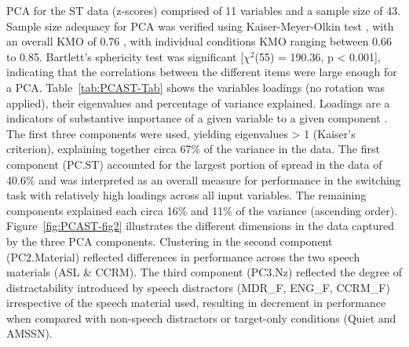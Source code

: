 \documentclass[a4paper, twoside]{templates/ociamthesis}
\begin{document}
PCA for the ST data (z-scores) comprised of 11 variables and a sample size of 43. Sample size adequacy for PCA was verified using Kaiser-Meyer-Olkin test \autocite[psych::KMO;][]{psychPackageR}, with an overall KMO of 0.76 \autocite[`good';][]{Field2012Chpt17}, with individual conditions KMO ranging between 0.66 to 0.85. Bartlett's sphericity test was significant {[}\(\chi^2\)(55) = 190.36, p \textless{} 0.001{]}, indicating that the correlations between the different items were large enough for a PCA. Table~\ref{tab:PCAST-Tab} shows the variables loadings (no rotation was applied), their eigenvalues and percentage of variance explained. Loadings are a indicators of substantive importance of a given variable to a given component \autocite{Field2012Chpt17}. The first three components were used, yielding eigenvalues \textgreater{} 1 (Kaiser's criterion), explaining together circa 67\% of the variance in the data. The first component (PC.ST) accounted for the largest portion of spread in the data of 40.6\% and was interpreted as an overall measure for performance in the switching task with relatively high loadings across all input variables. The remaining components explained each circa 16\% and 11\% of the variance (ascending order). Figure~\ref{fig:PCAST-fig2} illustrates the different dimensions in the data captured by the three PCA components. Clustering in the second component (PC2.Material) reflected differences in performance across the two speech materials (ASL \& CCRM). The third component (PC3.Nz) reflected the degree of distractability introduced by speech distractors (MDR\_F, ENG\_F, CCRM\_F) irrespective of the speech material used, resulting in decrement in performance when compared with non-speech distractors or target-only conditions (Quiet and AMSSN).
\end{document}
